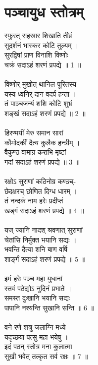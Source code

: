 \section{पञ्चायुध स्तोत्रम्}
स्फुरत् सहस्रार शिखाति तीव्रं\\
सुदर्शनं भास्कर कोटि तुल्यम् ।\\
सुरद्विषां प्राण विनाशि विष्णोः\\
चक्रं सदाऽहं शरणं प्रपद्ये ॥ 1 ॥\\
\\
विष्णोर् मुखोत् थानिल पूरितस्य\\
यस्य ध्वनिर् दान वदर्प हन्ता ।\\
तं पाञ्चजन्यं शशि कोटि शुभ्रं\\
शङ्खं सदाऽहं शरणं प्रपद्ये ॥ 2 ॥\\
\\
हिरण्मयीं मेरु समान सारां\\
कौमोदकीं दैत्य कुलैक हन्त्रीम् ।\\
वैकुण्ठ वामाग्र कराभि   मृष्टां\\
गदां सदाऽहं शरणं प्रपद्ये ॥ 3 ॥\\
\\
रक्षोऽ सुराणां कठिनोग्र कण्ठच्-\\
छेदक्षरच् छोणित दिग्ध धारम् ।\\
तं नन्दकं नाम हरेः प्रदीप्तं\\
खड्गं सदाऽहं शरणं प्रपद्ये ॥ 4 ॥\\
\\
यज् ज्यानि नादश् श्रवणात् सुराणां\\
चेतांसि निर्मुक्त भयानि सद्यः ।\\
भवन्ति दैत्या शनि बाण वर्षि\\
शार्ङ्गं सदाऽहं शरणं प्रपद्ये ॥ 5 ॥\\
\\
इमं हरेः पञ्च महा युधानां\\
स्तवं पठेद्योऽ नुदिनं प्रभाते ।\\
समस्त दुःखानि भयानि सद्यः\\
पापानि नश्यन्ति सुखानि सन्ति ॥ 6 ॥\\
\\
वने रणे शत्रु जलाग्नि मध्ये\\
यदृच्छया पत्सु महा भयेषु ।\\
इदं पठन् स्तोत्र मना कुलात्मा\\
सुखी भवेत् तत्कृत सर्व रक्षः ॥ 7 ॥\\
\\
[* अधिक श्लोकाः –\\
यच्चक्रशङ्खं गदखड्गशार्ङ्गिणं\\
पीताम्बरं कौस्तुभवत्सलाञ्छितम् ।\\
श्रियासमेतोज्ज्वलशोभिताङ्गं\\
विष्णुं सदाऽहं शरणं प्रपद्ये ॥\\
\\
जले रक्षतु वाराहः स्थले रक्षतु वामनः ।\\
अटव्यां नारसिंहश्क्ष्च सर्वतः पातु केशवः ॥ *]\\
